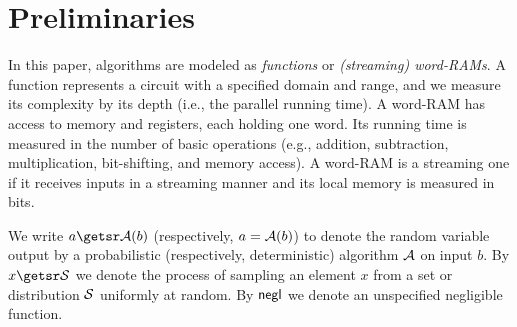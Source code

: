 
\section{Preliminaries}
\label{sec:pre}
In this paper, algorithms are modeled as \emph{functions} or \emph{(streaming) word-RAMs}. A function represents a circuit with a specified domain and range, and we measure its complexity by its depth (i.e., the parallel running time). A word-RAM has access to memory and registers, each holding one word. Its running time is measured in the number of basic operations (e.g., addition, subtraction, multiplication, bit-shifting, and memory access). A word-RAM is a streaming one if it receives inputs in a streaming manner and its local memory is measured in bits.


We write $a \getsr \A(b)$ (respectively, $a=\mathcal{A}(b)$) to denote the random variable output by a probabilistic (respectively, deterministic) algorithm $\mathcal{A}$ on input $b$.
By $x \getsr \BS$ we denote the process of sampling an element $x$ from a set or distribution $\mathcal{S}$ uniformly at random. 
By $\mathsf{negl}$ we denote an unspecified negligible function. %


